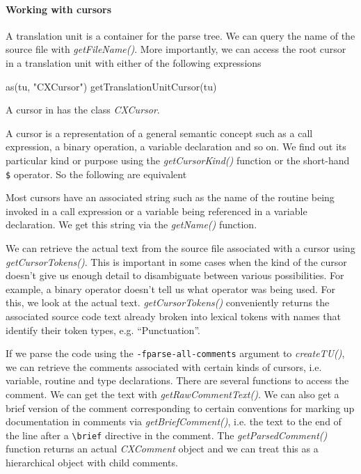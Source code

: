 \documentclass[article]{jss}
\def\R{\proglang{R}}
\def\Rfunc#1{\textsl{#1()}}
\def\Rdollar{\texttt{\$}}
\def\Rclass#1{\textit{#1}}
\def\dquote#1{``#1''}
\begin{document}
\paragraph{Working with cursors}
A translation unit is a container for the parse tree.
We can query the name of the source file  with
\Rfunc{getFileName}. More importantly, we can 
access the root cursor in a translation unit
with either of the following expressions
\begin{RCode}
as(tu, "CXCursor")
getTranslationUnitCursor(tu)
\end{RCode}
A cursor in \R{} has the class \Rclass{CXCursor}.

A cursor is a representation  of a general semantic concept such
as a call expression, a binary operation, a variable declaration and
so on.  We find out its particular kind or purpose using
the \Rfunc{getCursorKind}  function or the short-hand
\Rdollar{} operator. So the following are equivalent

Most cursors have an associated string such as the name of the routine
being invoked in a call expression or a variable being referenced in a
variable declaration.  We get this string via the \Rfunc{getName} function.

We can retrieve the actual text from the source file associated with a
cursor using \Rfunc{getCursorTokens}. This is important in some cases
when the kind of the cursor doesn't give us enough detail to
disambiguate between various possibilities.  For example, a binary
operator doesn't tell us what operator was being used.  For this, we
look at the actual text. \Rfunc{getCursorTokens} conveniently returns
the associated source code text already broken into lexical tokens
with names that identify their token types, e.g. \dquote{Punctuation}.

If we parse the code using the \verb+-fparse-all-comments+ argument to
\Rfunc{createTU}, we can retrieve the comments associated with certain
kinds of cursors, i.e. variable, routine and type declarations.  There
are several functions to access the comment.  We can get the text with
\Rfunc{getRawCommentText}. We can also get a brief version of the
comment corresponding to certain conventions for marking up
documentation in comments via \Rfunc{getBriefComment}, i.e.  the text
to the end of the line after a \verb+\brief+ directive in the comment.  The
\Rfunc{getParsedComment} function returns an actual \Rclass{CXComment} object
and we can treat this as a hierarchical object with child comments.
\end{document}
